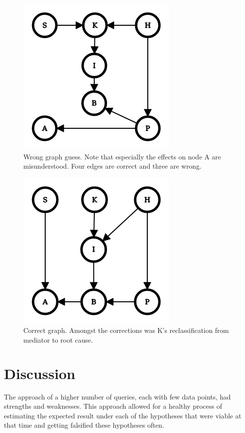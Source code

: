 \documentclass[12pt,fleqn,]{article}
\begin{document}
\begin{multicols}{2}
\begin{figure}[H]
	\centering
	\includegraphics[width=.6\linewidth]{wronggraph}
	\caption{Wrong graph guess. Note that especially the effects on node A are misunderstood. Four edges are correct and three are wrong.}
	\label{fig:wronggraph}
\end{figure}
\begin{figure}[H]
	\centering
	\includegraphics[width=.6\linewidth]{correctgraph}
	\caption{Correct graph. Amongst the corrections was K's reclassification from mediator to root cause.  }
	\label{fig:correctgraph}
\end{figure}

	
\section{Discussion}
The approach of a higher number of  queries, each with few data points, had strengths and weaknesses. This approach allowed for a healthy process of estimating the expected result under each of the hypotheses that were viable at that time and getting falsified these hypotheses often. 


\end{multicols}
\end{document}
